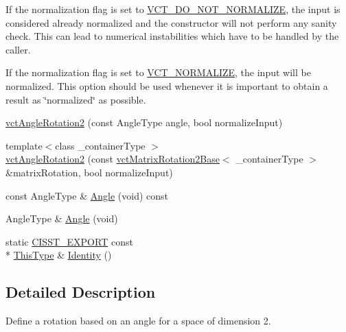 \begin{DoxyItemize}
\item If the normalization flag is set to \hyperlink{vct_forward_declarations_8h_a6fd516b0c35fa9967b4da5f03a788985}{V\-C\-T\-\_\-\-D\-O\-\_\-\-N\-O\-T\-\_\-\-N\-O\-R\-M\-A\-L\-I\-Z\-E}, the input is considered already normalized and the constructor will not perform any sanity check. This can lead to numerical instabilities which have to be handled by the caller.


\item If the normalization flag is set to \hyperlink{vct_forward_declarations_8h_ae54c682b919a7c5743ea498810518565}{V\-C\-T\-\_\-\-N\-O\-R\-M\-A\-L\-I\-Z\-E}, the input will be normalized. This option should be used whenever it is important to obtain a result as \char`\"{}normalized\char`\"{} as possible.


\end{DoxyItemize}\begin{DoxyCompactItemize}
\item 
\hyperlink{classvct_angle_rotation2_abf791aa494a888d6be11c4f35b461c89}{vct\-Angle\-Rotation2} (const Angle\-Type angle, bool normalize\-Input)
\item 
{\footnotesize template$<$class \-\_\-container\-Type $>$ }\\\hyperlink{classvct_angle_rotation2_ae2257fcc5c4f219dc7a06e9487de506c}{vct\-Angle\-Rotation2} (const \hyperlink{classvct_matrix_rotation2_base}{vct\-Matrix\-Rotation2\-Base}$<$ \-\_\-container\-Type $>$ \&matrix\-Rotation, bool normalize\-Input)
\item 
const Angle\-Type \& \hyperlink{classvct_angle_rotation2_a2d928d5eec6f93effa4e22c9a58b90ba}{Angle} (void) const 
\item 
Angle\-Type \& \hyperlink{classvct_angle_rotation2_a09fa3b9be3e5506a752c864a84fad4ee}{Angle} (void)
\item 
static \hyperlink{cmn_export_macros_8h_a99393e0c3ac434b2605235bbe20684f8}{C\-I\-S\-S\-T\-\_\-\-E\-X\-P\-O\-R\-T} const \\*
\hyperlink{classvct_angle_rotation2_a67339254f084f89c13aca70c1242d18e}{This\-Type} \& \hyperlink{classvct_angle_rotation2_afcd81f0cfc0aababc993b1407af93d29}{Identity} ()
\end{DoxyCompactItemize}


\subsection{Detailed Description}
Define a rotation based on an angle for a space of dimension 2. 

